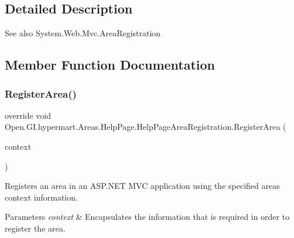 \subsection{Detailed Description}


\begin{DoxySeeAlso}{See also}
System.\+Web.\+Mvc.\+Area\+Registration


\end{DoxySeeAlso}


\subsection{Member Function Documentation}
\hypertarget{class_open_1_1_g_i_1_1hypermart_1_1_areas_1_1_help_page_1_1_help_page_area_registration_aee73751274402f096ce32ee010ef1a11}{}\label{class_open_1_1_g_i_1_1hypermart_1_1_areas_1_1_help_page_1_1_help_page_area_registration_aee73751274402f096ce32ee010ef1a11} 
\subsubsection{\texorpdfstring{Register\+Area()}{RegisterArea()}}
{\footnotesize\ttfamily override void Open.\+G\+I.\+hypermart.\+Areas.\+Help\+Page.\+Help\+Page\+Area\+Registration.\+Register\+Area (\begin{DoxyParamCaption}\item[{Area\+Registration\+Context}]{context }\end{DoxyParamCaption})}



Registers an area in an A\+S\+P.\+N\+ET M\+VC application using the specified area\textquotesingle{}s context information. 


\begin{DoxyParams}{Parameters}
{\em context} & Encapsulates the information that is required in order to register the area.\\
\hline
\end{DoxyParams}


